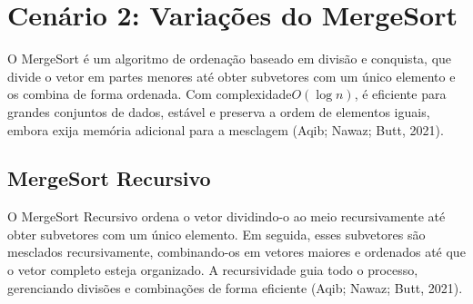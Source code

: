 \documentclass{SBCbookchapter}
\begin{document}
\begin{table}[h]
\centering
{}
\caption{QuickSort em Struct}
\end{table}







\section{Cenário 2: Variações do MergeSort}
O MergeSort é um algoritmo de ordenação baseado em divisão e conquista, que divide o vetor em partes menores até obter subvetores com um único elemento e os combina de forma ordenada. Com complexidade$O(\log n)$, é eficiente para grandes conjuntos de dados, estável e preserva a ordem de elementos iguais, embora exija memória adicional para a mesclagem (Aqib; Nawaz; Butt, 2021).

\subsection{MergeSort Recursivo}
O MergeSort Recursivo ordena o vetor dividindo-o ao meio recursivamente até obter subvetores com um único elemento. Em seguida, esses subvetores são mesclados recursivamente, combinando-os em vetores maiores e ordenados até que o vetor completo esteja organizado. A recursividade guia todo o processo, gerenciando divisões e combinações de forma eficiente  (Aqib; Nawaz; Butt, 2021).
\end{document}
